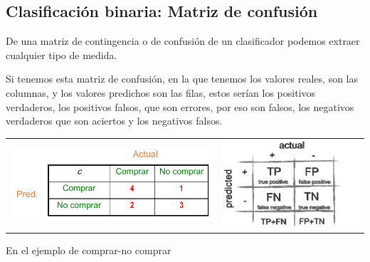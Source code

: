 \subsection{Clasificación binaria: Matriz de confusión}

De una matriz de contingencia o de confusión de un clasificador podemos extraer cualquier tipo de medida.

Si tenemos esta matriz de confusión, en la que tenemos los valores reales, son las columnas, y los valores predichos son las filas, estos serían los positivos verdaderos, los positivos falsos, que son errores, por eso son falsos, los negativos verdaderos que son aciertos y los negativos falsos.
\begin{center}
    \begin{tabular}{ c c }
        \includegraphics[scale=.67]{images/mod02-12_1.png}    &
        \includegraphics[scale=.67]{images/mod02-12_2.png}    
    \end{tabular}
\end{center}
En el ejemplo de comprar-no comprar
